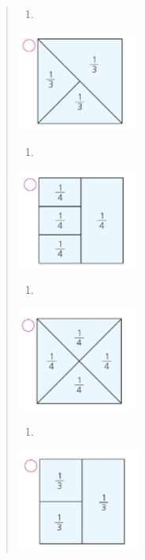 \begin{enumerate}
\begin{escolha}
\begin{enumerate}
\begin{itemize}
\begin{itemize}
\begin{escolha}
\begin{quote}
\begin{escolha}
{\begin{enumerate}
\def\labelenumi{\alph{enumi})}
\item
\end{enumerate}

\includegraphics[width=1.55847in,height=1.26678in]{media/image123.png}

\begin{enumerate}
\def\labelenumi{\alph{enumi})}
\item
\end{enumerate}

\includegraphics[width=1.55847in,height=1.27511in]{media/image124.png}

\begin{enumerate}
\def\labelenumi{\alph{enumi})}
\item
\end{enumerate}

\includegraphics[width=1.56680in,height=1.31678in]{media/image125.png}

\begin{enumerate}
\def\labelenumi{\alph{enumi})}
\item
\end{enumerate}

\includegraphics[width=1.58347in,height=1.30845in]{media/image126.png}

}
\end{escolha}
\end{quote}
\end{escolha}
\end{itemize}
\end{itemize}
\end{enumerate}
\end{escolha}
\end{enumerate}
